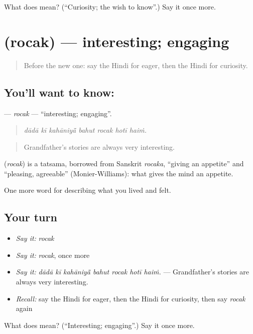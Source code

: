 \begin{tcolorbox}[breakable,colback=teal!4,colframe=teal!35!black,title={Before you move on}]
What does  mean? (\textquotedblleft{}Curiosity; the wish to know\textquotedblright{}.) Say it once more.
\end{tcolorbox}
\section[\texorpdfstring{\hi{रोचक} (rocak)}{रोचक (rocak)}]{ (rocak) — interesting; engaging}

\label{lesson:HI-C464-rocak}



\begin{quote}
Before the new one: say the Hindi for eager, then the Hindi for curiosity.
\end{quote}

\subsection*{You'll want to know: }
\textbf{} — \emph{rocak} — \textquotedblleft{}interesting; engaging\textquotedblright{}.

\begin{quote}
      
\end{quote}

\begin{quote}
\emph{dādā kī kahāniyā̃ bahut rocak hotī haiṁ.}
\end{quote}

\begin{quote}
Grandfather's stories are always very interesting.
\end{quote}

\begin{cousinweb}
\textbf{} (\emph{rocak}) is a tatsama, borrowed from Sanskrit \emph{rocaka}, \textquotedblleft{}giving an appetite\textquotedblright{} and \textquotedblleft{}pleasing, agreeable\textquotedblright{} (Monier-Williams): what gives the mind an appetite.
\end{cousinweb}

\begin{grammarlens}[title={What you've built}]
One more word for describing what you lived and felt.
\end{grammarlens}

\subsection*{Your turn}
\begin{itemize}
\raggedright
  \item \emph{Say it:} \emph{rocak}
  \item \emph{Say it:} \emph{rocak}, once more
  \item \emph{Say it:} \emph{dādā kī kahāniyā̃ bahut rocak hotī haiṁ.} — Grandfather's stories are always very interesting.
  \item \emph{Recall:} say the Hindi for eager, then the Hindi for curiosity, then say \emph{rocak} again
\end{itemize}

\begin{tcolorbox}[breakable,colback=teal!4,colframe=teal!35!black,title={Before you move on}]
What does  mean? (\textquotedblleft{}Interesting; engaging\textquotedblright{}.) Say it once more.
\end{tcolorbox}
